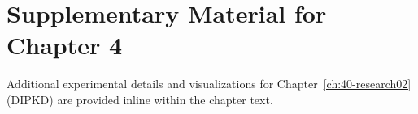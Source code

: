 \chapter{Supplementary Material for Chapter 4}
\label{ch:82-appendix-research02}

Additional experimental details and visualizations for Chapter~\ref{ch:40-research02} (DIPKD) are provided inline within the chapter text.
